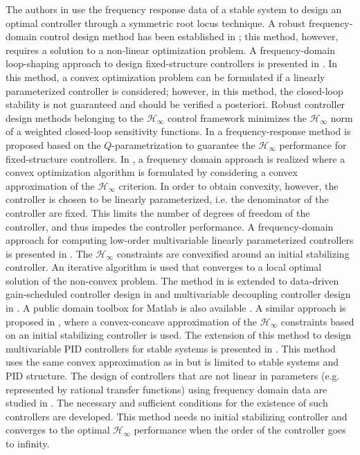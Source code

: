 \documentclass[journal]{IEEEtran}
\begin{document}
The authors in \cite{HDAV10} use the frequency response data of a stable system to design an optimal controller through a symmetric root locus technique. A robust frequency-domain control design method has been established in \cite{KNND13b}; this method, however, requires a solution to a non-linear optimization problem. A frequency-domain loop-shaping approach to design fixed-structure controllers is presented in \cite{KNND13c}. In this method, a convex optimization problem can be formulated if a linearly parameterized controller is considered; however, in this method, the closed-loop stability is not guaranteed and should be verified a posteriori. Robust controller design methods belonging to the $\mathcal{H}_{\infty}$ control framework minimizes the $\mathcal{H}_{\infty}$ norm of a weighted closed-loop sensitivity functions. In \cite{DWS09} a frequency-response method is proposed based on the $Q$-parametrization to guarantee the $\mathcal{H}_{\infty}$ performance for fixed-structure controllers. In \cite{KG10}, a frequency domain approach is realized where a convex optimization algorithm is formulated by considering a convex approximation of the $\mathcal{H}_{\infty}$ criterion. In order to obtain convexity, however, the controller is chosen to be linearly parameterized, i.e. the denominator of the controller are fixed. This limits the number of degrees of freedom of the controller, and thus impedes the controller performance. A frequency-domain approach for computing low-order multivariable linearly parameterized controllers is presented in \cite{SOW10}. The $\mathcal{H}_{\infty}$ constraints are convexified around an initial stabilizing controller. An iterative algorithm is used that converges to a local optimal solution of the non-convex problem. The method in \cite{KG10} is extended to data-driven gain-scheduled controller design in \cite{KE13a} and multivariable decoupling controller design in \cite{GKL10b}. A public domain toolbox for Matlab is also available \cite{Kar13}. A similar approach is proposed in  \cite{HAB13}, where a convex-concave approximation of the $\mathcal{H}_{\infty}$ constraints based on an initial stabilizing controller is used. The extension of this method to design multivariable PID controllers for stable systems is presented in \cite{BHA16}. This method uses the same convex approximation as in  \cite{SOW10} but is limited to stable systems and PID structure. The design of controllers that are not linear in parameters (e.g. represented by rational transfer functions) using frequency domain data are studied in \cite{KNZ16}. The necessary and sufficient conditions for the existence of such controllers are developed. This method needs no initial stabilizing controller and converges to the optimal  $\mathcal{H}_{\infty}$ performance when the order of the controller goes to infinity.
\end{document}

